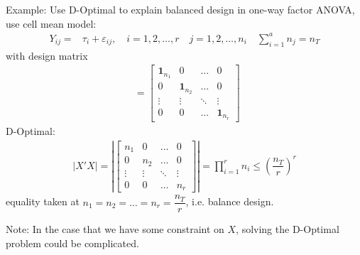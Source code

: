 Example: Use D-Optimal to explain balanced design in one-way factor ANOVA, use cell mean model:
\begin{align}
    Y_{ij}=& \tau _i+\varepsilon _{ij},\quad i=1,2,\ldots,r \quad j=1,2,\ldots,n_i \quad \sum_{i=1}^an_j=n_T
\end{align}
with design matrix 
\begin{align}
     \mathop{ n_{T\times r} }\limits_{} =\begin{bmatrix}
        \mathbf{1}_{n_1} & 0 & \ldots & 0\\
        0 & \mathbf{1}_{n_2} & \ldots & 0\\
        \vdots & \vdots & \ddots & \vdots\\
        0 & 0 & \ldots & \mathbf{1}_{n_r}
     \end{bmatrix}
\end{align}
D-Optimal:
\begin{align}
    |X'X|=\left|\begin{bmatrix}
        n_1 & 0 & \ldots & 0\\
        0 & n_2 & \ldots & 0\\
        \vdots & \vdots & \ddots & \vdots\\
        0 & 0 & \ldots & n_r
    \end{bmatrix} \right| = \prod_{i=1}^r n_i \leq \left( \dfrac{ n_T }{ r } \right)^r
\end{align}
equality taken at $ n_1=n_2=\ldots=n_r=\dfrac{ n_T }{ r }  $, i.e. balance design.

Note: In the case that we have some constraint on $ X $, solving the D-Optimal problem could be complicated.








